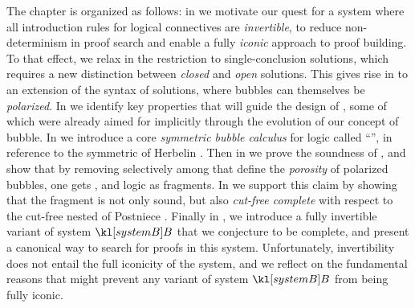 The chapter is organized as follows: in  we motivate our
quest for a system where all introduction rules for logical connectives are
\emph{invertible}, to reduce non-determinism in proof search and enable a fully
\emph{iconic} approach to proof building. To that effect, we relax in
 the restriction to single-conclusion solutions, which
requires a new distinction between \emph{closed} and \emph{open} solutions. This
gives rise in  to an extension of the syntax of solutions, where
bubbles can themselves be \emph{polarized}. In  we identify
key properties that will guide the design of , some of which were
already aimed for implicitly through the evolution of our concept of bubble. In
 we introduce a core \emph{symmetric bubble calculus}
for  logic called ``'', in reference to the symmetric
 of Herbelin . Then in
 we prove the soundness of , and show
that by removing selectively among  that define the
\emph{porosity} of polarized bubbles, one gets ,
 and  logic as fragments. In
 we support this claim by showing that the
 fragment is not only sound, but also \emph{cut-free complete}
with respect to the cut-free nested   of Postniece
\cite{postniece_deep_2009}. Finally in , we
introduce a fully invertible variant of system $\sysB$ that we conjecture to be
complete, and present a canonical way to search for proofs in this system.
Unfortunately, invertibility does not entail the full iconicity of the system,
and we reflect on the fundamental reasons that might prevent any variant of
system $\sysB$ from being fully iconic.


